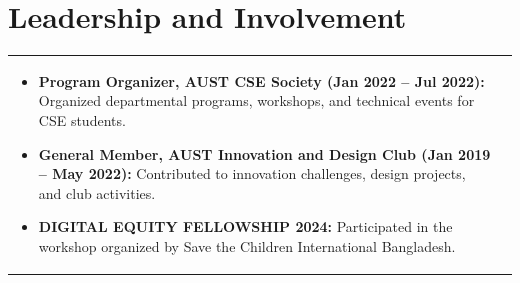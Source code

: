 \documentclass[a4paper,8pt]{article}
\begin{document}
\section{Leadership and Involvement}
\begin{tabularx}{\linewidth}{ @{}l r@{} }
\begin{minipage}[t]{\linewidth}
\begin{itemize}[nosep,after=\strut, leftmargin=2em, itemsep=2pt]
\item \textbf{Program Organizer, AUST CSE Society (Jan 2022 – Jul 2022):} Organized departmental programs, workshops, and technical events for CSE students.
\item \textbf{General Member, AUST Innovation and Design Club (Jan 2019 – May 2022):} Contributed to innovation challenges, design projects, and club activities.
\item \textbf{DIGITAL EQUITY FELLOWSHIP 2024:} Participated in the workshop organized by Save the Children International Bangladesh.

\end{itemize}
\end{minipage}
\end{tabularx}
\end{document}
